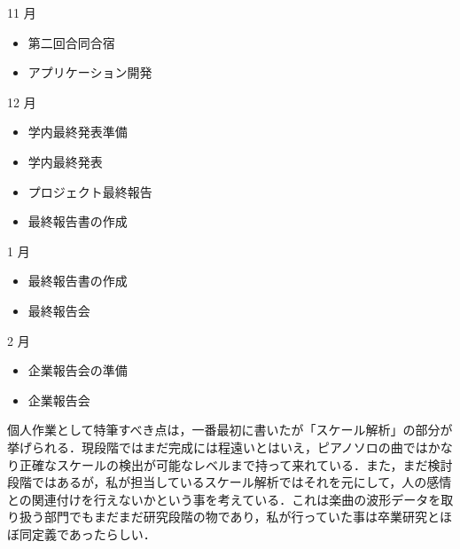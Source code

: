 11 月
\begin{itemize}
\item 第二回合同合宿
\item アプリケーション開発
\end{itemize}
12 月
\begin{itemize}
\item 学内最終発表準備
\item 学内最終発表
\item プロジェクト最終報告
\item 最終報告書の作成
\end{itemize}
1 月
\begin{itemize}
\item 最終報告書の作成
\item 最終報告会
\end{itemize}
2 月
\begin{itemize}
\item 企業報告会の準備
\item 企業報告会
\end{itemize}
個人作業として特筆すべき点は，一番最初に書いたが「スケール解析」の部分が挙げられる．現段階ではまだ完成には程遠いとはいえ，ピアノソロの曲ではかなり正確なスケールの検出が可能なレベルまで持って来れている．また，まだ検討段階ではあるが，私が担当しているスケール解析ではそれを元にして，人の感情との関連付けを行えないかという事を考えている．これは楽曲の波形データを取り扱う部門でもまだまだ研究段階の物であり，私が行っていた事は卒業研究とほぼ同定義であったらしい．

